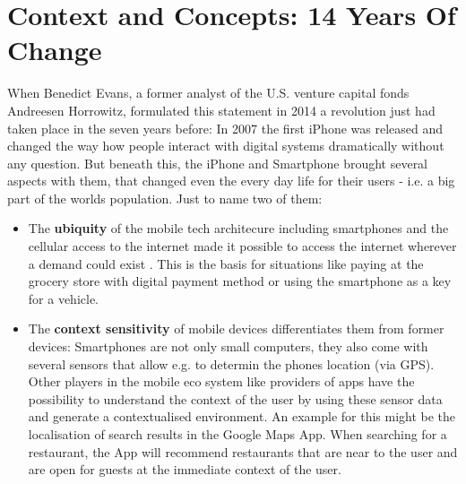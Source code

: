 \documentclass[11pt,letterpaper]{article}
\begin{document}
\section*{Context and Concepts: 14 Years Of Change}
\begin{center}
 \autocite[][]{evans14}
 \end{center}
When Benedict Evans, a former analyst of the U.S. venture capital fonds Andreesen Horrowitz, formulated this statement in 2014 a revolution just had taken place in the seven years before: In 2007 the first iPhone was released and changed the way how people interact with digital systems dramatically without any question. But beneath this, the iPhone and Smartphone brought several aspects with them, that changed even the every day life for their users - i.e. a big part of the worlds population. Just to name two of them: 
\begin{itemize}
\item 
The \textbf{ubiquity} of the mobile tech architecure including smartphones and the cellular access to the internet made it possible to access the internet wherever a demand could exist \autocite[][p.1]{okazaki13}. This is the basis for situations like paying at the grocery store with digital payment method or using the smartphone as a key for a vehicle.
\item
The \textbf{context sensitivity} of mobile devices differentiates them from former devices: Smartphones are not only small computers, they also come with several sensors that allow e.g. to determin the phones location (via GPS)\autocite[][p.1]{minch04}. Other players in the mobile eco system like providers of apps have the possibility to understand the context of the user by using these sensor data and generate a contextualised environment. An example for this might be the localisation of search results in the Google Maps App. When searching for a restaurant, the App will recommend restaurants that are near to the user and are open for guests at the immediate context of the user.
\end{itemize}
\end{document}
